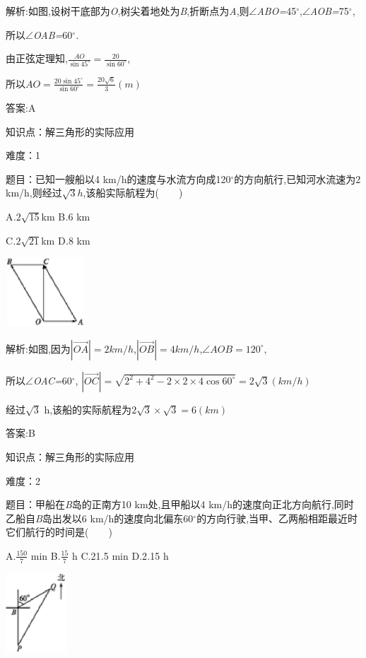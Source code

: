 \documentclass{article} %
\begin{document}
 解析:如图,设树干底部为\textit{O},树尖着地处为\textit{B},折断点为\textit{A},则$\mathrm{\angle}$\textit{ABO=}45$\mathrm{{}^\circ}$,$\mathrm{\angle}$\textit{AOB=}75$\mathrm{{}^\circ}$,

所以$\mathrm{\angle}$\textit{OAB=}60$\mathrm{{}^\circ}$\textit{.}

由正弦定理知,$\frac{AO}{\sin 45^{\circ}}=\frac{20}{\sin 60^{\circ}}$,

所以$AO=\frac{20\sin 45^{\circ}}{\sin 60^{\circ}}=\frac{20\sqrt{6}}{3}(m)$

 答案:A

知识点：解三角形的实际应用

难度：1

 题目：已知一艘船以4 km/h的速度与水流方向成120$\mathrm{{}^\circ}$的方向航行,已知河水流速为2 km/h,则经过$\sqrt{3}h$,该船实际航程为(\textit{　　})

 A\textit{.}$2\sqrt{15}$km B\textit{.}6 km

 C\textit{.}$2\sqrt{21}$km D\textit{.}8 km

 \includegraphics*[width=1.17in, height=1.01in, keepaspectratio=false]{image1067}

 解析:如图,因为$|\vec{OA}|=2km/h$,$|\vec{OB}|=4km/h$,$\angle AOB=120^{\circ}$,

所以$\mathrm{\angle}$\textit{OAC=}60$\mathrm{{}^\circ}$,
$|\vec{OC}|=\sqrt{2^2+4^2-2\times2\times4\cos60^{\circ}}=2\sqrt{3}(km/h)$

经过$\sqrt{3}$ h,该船的实际航程为$2\sqrt{3}\times\sqrt{3}=6(km)$

 答案:B

知识点：解三角形的实际应用

难度：2

 题目：甲船在\textit{B}岛的正南方10 km处,且甲船以4 km/h的速度向正北方向航行,同时乙船自\textit{B}岛出发以6 km/h的速度向北偏东60$\mathrm{{}^\circ}$的方向行驶,当甲、乙两船相距最近时它们航行的时间是(\textit{　　})

 A.$\frac{150}{7}$ min B.$\frac{15}{7}$ h C.21\textit{.}5 min D.2\textit{.}15 h

 \includegraphics*[width=0.90in, height=1.17in, keepaspectratio=false]{image1077}
\end{document}
